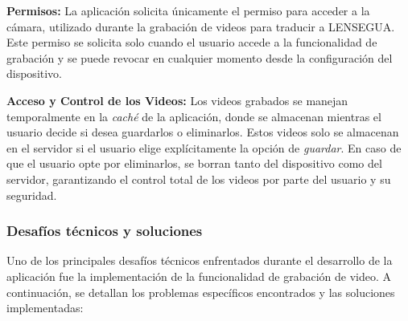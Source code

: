 \textbf{Permisos:} La aplicación solicita únicamente el permiso para acceder a la cámara, utilizado durante la grabación de videos para traducir a LENSEGUA. Este permiso se solicita solo cuando el usuario accede a la funcionalidad de grabación y se puede revocar en cualquier momento desde la configuración del dispositivo.

\textbf{Acceso y Control de los Videos:} Los videos grabados se manejan temporalmente en la \textit{caché} de la aplicación, donde se almacenan mientras el usuario decide si desea guardarlos o eliminarlos. Estos videos solo se almacenan en el servidor si el usuario elige explícitamente la opción de \textit{guardar}. En caso de que el usuario opte por eliminarlos, se borran tanto del dispositivo como del servidor, garantizando el control total de los videos por parte del usuario y su seguridad.


\subsubsection{Desafíos técnicos y soluciones}

Uno de los principales desafíos técnicos enfrentados durante el desarrollo de la aplicación fue la implementación de la funcionalidad de grabación de video. A continuación, se detallan los problemas específicos encontrados y las soluciones implementadas:

